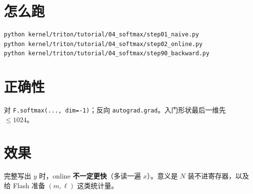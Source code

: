 \section{怎么跑}

\begin{runcmd}
\begin{lstlisting}[style=shell]
python kernel/triton/tutorial/04_softmax/step01_naive.py
python kernel/triton/tutorial/04_softmax/step02_online.py
python kernel/triton/tutorial/04_softmax/step90_backward.py
\end{lstlisting}
\end{runcmd}

\section{正确性}

\begin{note}
对 \texttt{F.softmax(..., dim=-1)}；反向 \texttt{autograd.grad}。入门形状最后一维先 $\le 1024$。
\end{note}

\section{效果}

\begin{remark}
完整写出 $y$ 时，online \textbf{不一定更快}（多读一遍 $x$）。意义是 $N$ 装不进寄存器，以及给 Flash 准备 $(m,\ell)$ 这类统计量。
\end{remark}
